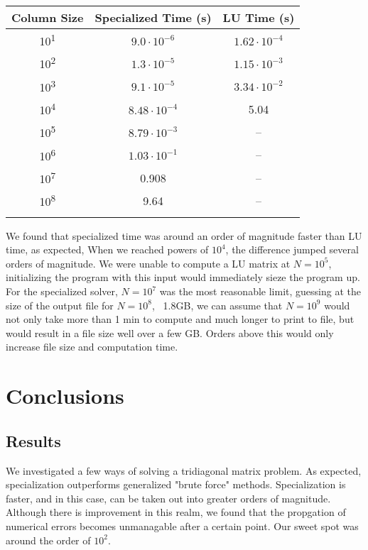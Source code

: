 \documentclass[10pt,showpacs,preprintnumbers,footinbib,amsmath,amssymb,aps,prl,twocolumn,groupedaddress,superscriptaddress,showkeys]{revtex4-1}
\begin{document}
	\begin{center}
		\begin{tabular}{ccc}
			\hline \hline
			Column Size & Specialized Time (s) & LU Time (s)\\
			\hline		
			10\textsuperscript{1} & $9.0 \cdot 10^{-6}$      & $1.62 \cdot 10^{-4}$  \\
			10\textsuperscript{2} & $1.3 \cdot 10^{-5}$      &  $1.15 \cdot 10^{-3}$ \\
			10\textsuperscript{3} & $9.1 \cdot 10^{-5}$    &  $3.34 \cdot 10^{-2}$  \\
			10\textsuperscript{4} & $8.48 \cdot 10^{-4}$    &   5.04\\
			10\textsuperscript{5} & $8.79 \cdot 10^{-3}$    & --\\
			10\textsuperscript{6} & $1.03 \cdot 10^{-1}$    & --\\
			10\textsuperscript{7} & 0.908                               & --\\
                        10\textsuperscript{8} & 9.64                               & --\\
			\hline
			\label{timingtable}
		\end{tabular}
	\end{center}
	We found that specialized time was around an order of magnitude faster than LU time, as expected, When we reached powers of $10^{4}$, the difference jumped several orders of magnitude. We were unable to compute a LU matrix at $N=10^{5}$, initializing the program with this input would immediately sieze the program up. For the specialized solver, $N=10^{7}$ was the most reasonable limit, guessing at the size of the output file for $N=10^{8}$, ~1.8GB, we can assume that $N=10^{9}$ would not only take more than 1 min to compute and much longer to print to file, but would result in a file size well over a few GB. Orders above this would only increase file size and computation time. \\


\section{Conclusions}
	\subsection{Results}
	We investigated a few ways of solving a tridiagonal matrix problem. As expected, specialization outperforms generalized "brute force" methods. Specialization is faster, and in this case, can be taken out into greater orders of magnitude. Although there is improvement in this realm, we found that the propgation of numerical errors becomes unmanagable after a certain point. Our sweet spot was around the order of $10^{2}$.
\end{document}
